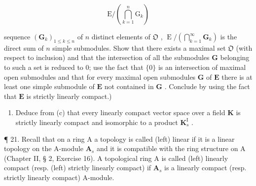\[
\mathrm{E} / \left(\bigcap_ {k = 1} ^ {n} \mathrm{G} _ {k}\right)
\]

sequence \((\mathbf{G}_k)_{1\leqslant k\leqslant n}\) of \(n\) distinct elements of \(\mathfrak{O}\) , \(\operatorname{E} / \left(\bigcap_{k=1}^{\infty}\mathbf{G}_k\right)\) is the direct sum of \(n\) simple submodules. Show that there exists a maximal set \(\mathfrak{O}\) (with respect to inclusion) and that the intersection of all the submodules \(\mathbf{G}\) belonging to such a set is reduced to 0; use the fact that \(\{0\}\) is an intersection of maximal open submodules and that for every maximal open submodules \(\mathbf{G}\) of \(\mathbf{E}\) there is at least one simple submodule of \(\mathbf{E}\) not contained in \(\mathbf{G}\) . Conclude by using the fact that \(\mathbf{E}\) is strictly linearly compact.)

\begin{enumerate}
\def\labelenumi{(\alph{enumi})}
\setcounter{enumi}{3}
\tightlist
\item
  Deduce from (c) that every linearly compact vector space over a field \(\mathbf{K}\) is strictly linearly compact and isomorphic to a product \(\mathbf{K}_s^{\mathrm{I}}\) .
\end{enumerate}

¶ 21. Recall that on a ring A a topology is called (left) linear if it is a linear topology on the A-module \(\mathbf{A}_s\) and it is compatible with the ring structure on A (Chapter II, § 2, Exercise 16). A topological ring A is called (left) linearly compact (resp. (left) strictly linearly compact) if \(\mathbf{A}_s\) is a linearly compact (resp. strictly linearly compact) A-module.

